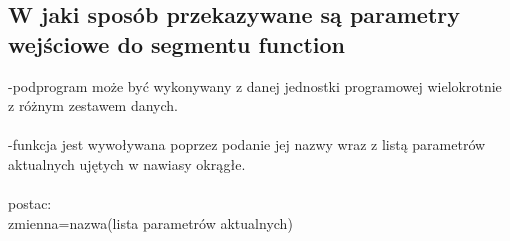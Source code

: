 \subsection{W jaki sposób przekazywane są parametry wejściowe do segmentu function}
-podprogram może być wykonywany z danej jednostki programowej wielokrotnie z różnym zestawem danych.
\\
\\
-funkcja jest wywoływana poprzez podanie jej nazwy wraz z listą parametrów aktualnych ujętych w nawiasy okrągłe.
\\
\\
postac: 
\\
zmienna=nazwa(lista parametrów aktualnych)
